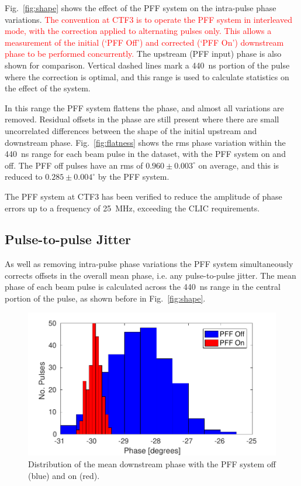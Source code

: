 \documentclass[%
 reprint,
superscriptaddress,
 amsmath,amssymb,
 prl,
]{revtex4-1}
\begin{document}
Fig.~\ref{fig:shape} shows the effect of the PFF system on the intra-pulse 
phase variations. \textcolor{red}{The convention at CTF3 is to operate the PFF 
system in 
interleaved mode, with 
the correction applied to alternating pulses only. This allows a measurement of 
the initial (`PFF Off') and corrected (`PFF On') downstream phase to be 
performed concurrently.} The upstream (PFF input) phase is also shown for 
comparison. Vertical dashed lines mark a 440~ns portion of the pulse where the 
correction is optimal, and this range is used to calculate statistics on the 
effect of the system. 

In this range the PFF system flattens the phase, 
and almost all variations are removed. Residual offsets in the phase are still 
present where there are small uncorrelated differences between the shape of the 
initial upstream and downstream phase. Fig.~\ref{fig:flatness} shows the rms 
phase variation within the 440~ns range 
for each beam pulse in the dataset, with the PFF system on and off. The PFF off 
pulses have an rms of \(0.960\pm0.003^\circ\) on average, and this is reduced 
to \(0.285\pm0.004^\circ\) by the PFF system.

The PFF system at CTF3 has been verified to reduce the amplitude of 
phase errors up to a frequency of 25~MHz, exceeding the CLIC requirements.



\subsection{\label{ss:meanJit}Pulse-to-pulse Jitter}

As well as removing intra-pulse phase variations the PFF system simultaneously 
corrects offsets in the overall mean phase, i.e. any pulse-to-pulse jitter. The 
mean phase of each beam pulse is calculated across the 440~ns range in the 
central portion of the pulse, as shown before in Fig.~\ref{fig:shape}.

\begin{figure}
	\includegraphics[width=\columnwidth]{figs/meanJit}%
	\caption{\label{fig:meanJit}Distribution of the mean downstream phase with 
		the 
		PFF system off (blue) and on (red).}
\end{figure}
\end{document}
